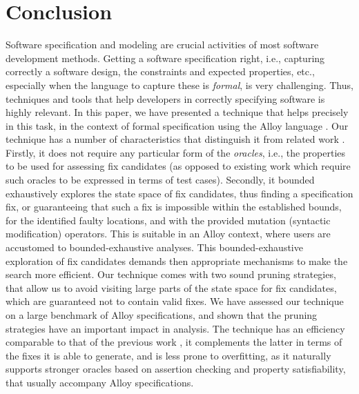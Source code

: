 \section{Conclusion}

Software specification and modeling are crucial activities of most software development methods. Getting a software specification right, i.e., capturing correctly a software design, the constraints and expected properties, etc., especially when the language to capture these is \emph{formal}, is very challenging. Thus, techniques and tools that help developers in correctly specifying software is highly relevant. In this paper, we have presented a technique that helps precisely in this task, in the context of formal specification using the Alloy language \cite{Jackson2006}. Our technique has a number of characteristics that distinguish it from related work \cite{Wang+2019}. Firstly, it does not require any particular form of the \emph{oracles}, i.e., the properties to be used for assessing fix candidates (as opposed to existing work which require such oracles to be expressed in terms of test cases). Secondly, it bounded exhaustively explores the state space of fix candidates, thus finding a specification fix, or guaranteeing that such a fix is impossible within the established bounds, for the identified faulty locations, and with the provided mutation (syntactic modification) operators. This is suitable in an Alloy context, where users are accustomed to bounded-exhaustive analyses. This bounded-exhaustive exploration of fix candidates demands then appropriate mechanisms to make the search more efficient. Our technique comes with two sound pruning strategies, that allow us to avoid visiting large parts of the state space for fix candidates, which are guaranteed not to contain valid fixes. We have assessed our technique on a large benchmark of Alloy specifications, and shown that the pruning strategies have an important impact in analysis. The technique has an efficiency comparable to that of the previous work  \cite{Wang+2019}, it complements the latter in terms of the fixes it is able to generate, and is less prone to overfitting, as it naturally supports stronger oracles based on assertion checking and property satisfiability, that usually accompany Alloy specifications.
